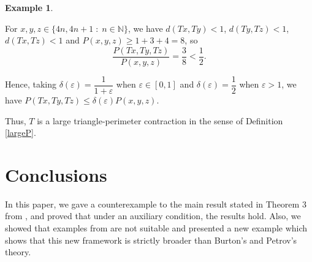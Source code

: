 \documentclass[12 pt]{article}
\theoremstyle{lema}
\theoremstyle{proposition}
\theoremstyle{theorem}
\theoremstyle{theorem}
\theoremstyle{corollary}
\theoremstyle{definition}
\theoremstyle{example}
\newtheorem{example}{Example}[section]
\def\n{\mathbb N}
\begin{document}
\begin{example}
\begin{enumerate}
			For \(x,y,z \in \{ 4n, 4n+1\; : \;n \in \n \} \), we have \(d(Tx,Ty) < 1\), \(d(Ty,Tz) < 1\), \(d(Tx,Tz) < 1\) and \(P(x, y, z) \geq 1+3+4 = 8\), so
			\[ \dfrac{P(Tx, Ty, Tz)}{P(x, y, z)} = \dfrac{3}{8} < \dfrac12.\]
			
			Hence, taking \(\delta(\varepsilon) = \dfrac{1}{1+\varepsilon}\) when \(\varepsilon \in [0,1]\) and \(\delta(\varepsilon) = \dfrac12\) when \(\varepsilon >1\), we have
			\(P(Tx,Ty,Tz)  \leq \delta(\varepsilon) P(x,y,z).\)
			
			Thus, \(T\) is a large triangle-perimeter contraction in the sense of Definition \ref{largeP}.
			
		\end{enumerate}
	\end{example}
	
	\section{Conclusions}

	In this paper, we gave a counterexample to the main result stated in Theorem 3 from \cite{Mesmouli}, and proved that under an auxiliary condition, the results hold. Also, we showed that examples from \cite{Mesmouli} are not suitable and presented a new example which shows that this new framework is strictly broader than Burton's and Petrov's theory.
\end{document}
